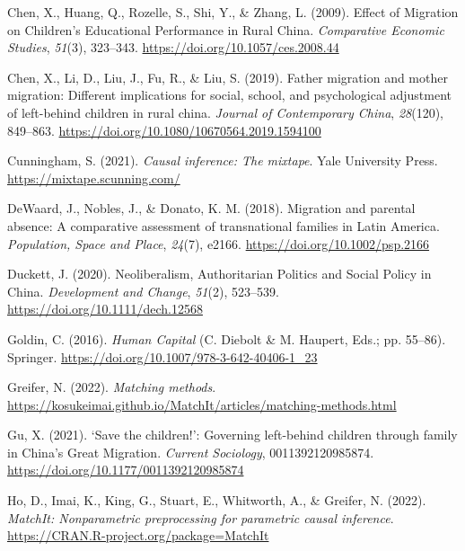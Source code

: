 \documentclass[
  man,floatsintext]{apa7}
\newlength{\cslhangindent}
\newlength{\cslentryspacingunit} %
\newenvironment{CSLReferences}[2] %
 {%
  \setlength{\parindent}{0pt}
  \ifodd #1
  \let\oldpar\par
  \def\par{\hangindent=\cslhangindent\oldpar}
  \fi
  \setlength{\parskip}{#2\cslentryspacingunit}
 }%
 {}
\begin{document}
\begin{CSLReferences}{1}{0}
\leavevmode{}%
Chen, X., Huang, Q., Rozelle, S., Shi, Y., \& Zhang, L. (2009). Effect of Migration on Children's Educational Performance in Rural China. \emph{Comparative Economic Studies}, \emph{51}(3), 323--343. \url{https://doi.org/10.1057/ces.2008.44}

\leavevmode{}%
Chen, X., Li, D., Liu, J., Fu, R., \& Liu, S. (2019). Father migration and mother migration: Different implications for social, school, and psychological adjustment of left-behind children in rural china. \emph{Journal of Contemporary China}, \emph{28}(120), 849--863. \url{https://doi.org/10.1080/10670564.2019.1594100}

\leavevmode{}%
Cunningham, S. (2021). \emph{Causal inference: The mixtape}. Yale University Press. \url{https://mixtape.scunning.com/}

\leavevmode{}%
DeWaard, J., Nobles, J., \& Donato, K. M. (2018). Migration and parental absence: A comparative assessment of transnational families in Latin America. \emph{Population, Space and Place}, \emph{24}(7), e2166. \url{https://doi.org/10.1002/psp.2166}

\leavevmode{}%
Duckett, J. (2020). Neoliberalism, Authoritarian Politics and Social Policy in China. \emph{Development and Change}, \emph{51}(2), 523--539. \url{https://doi.org/10.1111/dech.12568}

\leavevmode{}%
Goldin, C. (2016). \emph{Human Capital} (C. Diebolt \& M. Haupert, Eds.; pp. 55--86). Springer. \url{https://doi.org/10.1007/978-3-642-40406-1_23}

\leavevmode{}%
Greifer, N. (2022). \emph{Matching methods}. \url{https://kosukeimai.github.io/MatchIt/articles/matching-methods.html}

\leavevmode{}%
Gu, X. (2021). {`}Save the children!{'}: Governing left-behind children through family in China{'}s Great Migration. \emph{Current Sociology}, 0011392120985874. \url{https://doi.org/10.1177/0011392120985874}

\leavevmode{}%
Ho, D., Imai, K., King, G., Stuart, E., Whitworth, A., \& Greifer, N. (2022). \emph{MatchIt: Nonparametric preprocessing for parametric causal inference}. \url{https://CRAN.R-project.org/package=MatchIt}


\end{CSLReferences}
\end{document}
